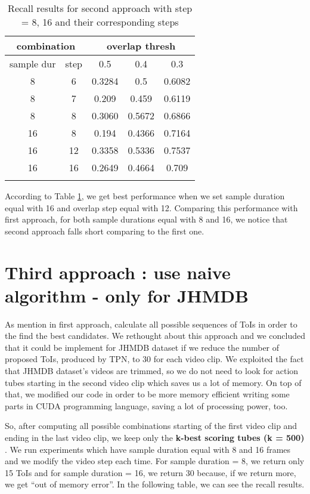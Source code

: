 \begin{center}
\begin{longtable}{||c c||c c c||}
  \hline
  \multicolumn{2}{||c||}{\textbf{combination}} &\multicolumn{3}{|c||}{\textbf{overlap thresh}}\\

  \hline
  sample dur & step &   0.5  &  0.4 &  0.3 \\
  \hline   \hline
  8 & 6 & 0.3284 & 0.5 & 0.6082  \\
  \hline
  8 & 7 & 0.209	& 0.459 & 0.6119 \\
  \hline
  8 & 8 & 0.3060 & 0.5672 & 0.6866 \\
  \hline
  16 & 8  & 0.194 & 0.4366 & 0.7164 \\
  \hline
  16 & 12 & 0.3358 & 0.5336 & 0.7537 \\
  \hline
  16 & 16 & 0.2649 & 0.4664 & 0.709 \\
  
  \hline     \hline                          

  \caption{Recall results for second approach with step = 8, 16 and their corresponding steps }
  \label{table:conn_app2}
\end{longtable} 
\end{center}

According to  Table \ref{table:conn_app2}, we get best performance when we set sample duration equal with  16 and overlap step equal with 12.
Comparing this performance with first approach, for both sample durations equal with 8 and 16, we notice that second approach falls short
comparing to the first one. 

\section{Third approach : use naive algorithm - only for JHMDB}

As mention in first approach, \cite{DBLP:journals/corr/HouCS17} calculate all possible sequences of ToIs in order to the find the best
candidates. We rethought about this approach and we concluded that it could be implement for JHMDB dataset if we reduce the number of proposed
ToIs, produced by TPN,  to 30 for each video clip. We exploited the fact that JHMDB dataset's videos are trimmed, so we do not need to look
for action tubes starting in the second video clip which saves us a lot of memory. On top of that, we modified our code
in order to be more memory efficient  writing some parts in CUDA programming language, saving a lot of processing power, too. \par
So, after computing all possible combinations starting of the first video clip and ending in the last video clip, we keep only the
\textbf{k-best scoring tubes (k = 500) }. We run experiments which have sample duration equal with 8 and 16 frames and we modify the video step each time.
For sample duration = 8, we return only 15 ToIs and for sample duration = 16, we return 30 because, if we return more, we get ``out of memory error''.
In the following table, we can see the recall results. \par  

